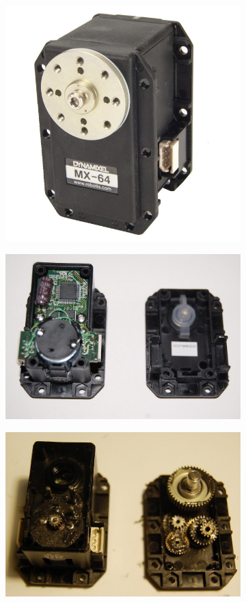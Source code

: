 \begin{figure}[htb]
    \centerfloat
    \begin{subfigure}{0.3\paperwidth}
        \centering
        \includegraphics[width=0.8\linewidth]{../media/dynamixel1.jpg}
    \end{subfigure}
    \begin{subfigure}{0.3\paperwidth}
        \centering
        \includegraphics[width=0.95\linewidth]{../media/dynamixel2.jpg}
    \end{subfigure}
    \begin{subfigure}{0.3\paperwidth}
        \centering
        \includegraphics[width=0.95\linewidth]{../media/dynamixel3.jpg}

\end{subfigure}
\end{figure}
